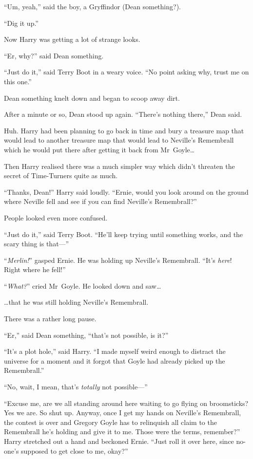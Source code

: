 “Um, yeah,” said the boy, a Gryffindor (Dean something?).

“Dig it up.”

Now Harry was getting a lot of strange looks.

“Er, why?” said Dean something.

“Just do it,” said Terry Boot in a weary voice.
“No point asking why, trust me on this one.”

Dean something knelt down and began to scoop away dirt.

After a minute or so, Dean stood up again.
“There’s nothing there,” Dean said.

Huh. Harry had been planning to go back in time and bury a treasure map that would lead to another treasure map that would lead to Neville’s Remembrall which he would put there after getting it back from Mr~Goyle…

Then Harry realised there was a much simpler way which didn’t threaten the secret of Time-Turners quite as much.

“Thanks, Dean!” Harry said loudly.
“Ernie, would you look around on the ground where Neville fell and see if you can find Neville’s Remembrall?”

People looked even more confused.

“Just do it,” said Terry Boot.
“He’ll keep trying until something works, and the scary thing is that—”

“\emph{Merlin!}” gasped Ernie. He was holding up Neville’s Remembrall.
“It’s \emph{here}! Right where he fell!”

“\emph{What?}” cried Mr~Goyle. He looked down and saw…

…that he was still holding Neville’s Remembrall.

There was a rather long pause.

“Er,” said Dean something, “that’s not possible, is it?”

“It’s a plot hole,” said Harry.
“I made myself weird enough to distract the universe for a moment and it forgot that Goyle had already picked up the Remembrall.”

“No, wait, I mean, that’s \emph{totally} not possible—”

“Excuse me, are we all standing around here waiting to go flying on broomsticks? Yes we are. So shut up. Anyway, once I get my hands on Neville’s Remembrall, the contest is over and Gregory Goyle has to relinquish all claim to the Remembrall he’s holding and give it to me. Those were the terms, remember?” Harry stretched out a hand and beckoned Ernie.
“Just roll it over here, since no-one’s supposed to get close to me, okay?”

